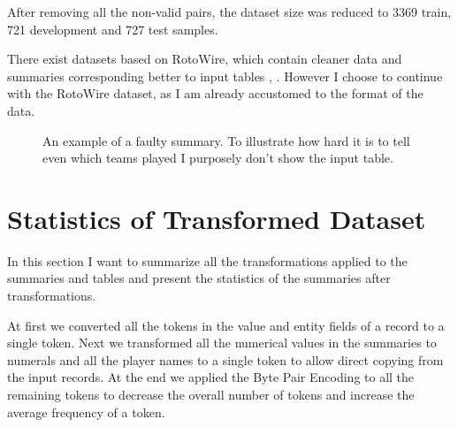 After removing all the non-valid pairs, the dataset size was reduced to 3369 train, 721 development and 727 test samples.

There exist datasets based on RotoWire, which contain cleaner data and summaries corresponding better to input tables \citep{wang-2019-revisiting}, \citep{thomson-2020-sportsett}. However I choose to continue with the RotoWire dataset, as I am already accustomed to the format of the data.

\begin{figure}[h]
    \caption{\centering An example of a faulty summary. To illustrate how hard it is to tell even which teams played I purposely don't show the input table.} \label{faulty_summary}
\end{figure}

\section{Statistics of Transformed Dataset}

In this section I want to summarize all the transformations applied to the summaries and tables and present the statistics of the summaries after transformations.

At first we converted all the tokens in the value and entity fields of a record to a single token. Next we transformed all the numerical values in the summaries to numerals and all the player names to a single token to allow direct copying from the input records. At the end we applied the Byte Pair Encoding to all the remaining tokens to decrease the overall number of tokens and increase the average frequency of a token.

